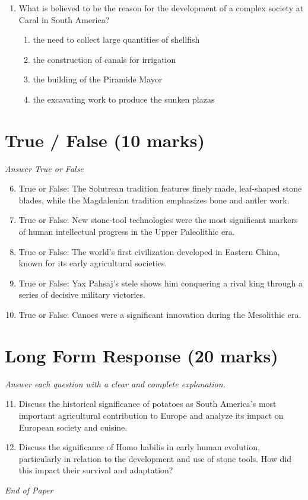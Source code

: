 \documentclass[12pt]{article}
\begin{document}
\begin{enumerate}[label=\arabic*.]
\begin{enumerate}[label=(\alph*)]
    \item 5,000 years ago
    \item just after A.D. 1000
    \item before A.D. 1000
    \item 2,000 years ago
\end{enumerate}
\item What is believed to be the reason for the development of a complex society at Caral in
South America?
\begin{enumerate}[label=(\alph*)]
    \item the need to collect large quantities of shellfish
    \item the construction of canals for irrigation
    \item the building of the Piramide Mayor
    \item the excavating work to produce the sunken plazas
\end{enumerate}
\end{enumerate}

\section*{True / False (10 marks)}
\textit{Answer True or False}
\begin{enumerate}[label=\arabic*.]
\setcounter{enumi}{5}
\item True or False: The Solutrean tradition features finely made, leaf-shaped stone blades, while the Magdalenian tradition emphasizes bone and antler work.
\item True or False: New stone-tool technologies were the most significant markers of human intellectual progress in the Upper Paleolithic era.
\item True or False: The world's first civilization developed in Eastern China, known for its early agricultural societies.
\item True or False: Yax Pahsaj's stele shows him conquering a rival king through a series of decisive military victories.
\item True or False: Canoes were a significant innovation during the Mesolithic era.
\end{enumerate}

\section*{Long Form Response (20 marks)}
\textit{Answer each question with a clear and complete explanation.}
\begin{enumerate}[label=\arabic*.]
\setcounter{enumi}{10}
\item Discuss the historical significance of potatoes as South America's most important
agricultural contribution to Europe and analyze its impact on European society and
cuisine.
\item Discuss the significance of Homo habilis in early human evolution, particularly in
relation to the development and use of stone tools. How did this impact their survival and
adaptation?
\end{enumerate}

\vfill
\noindent\textit{End of Paper}
\end{document}

